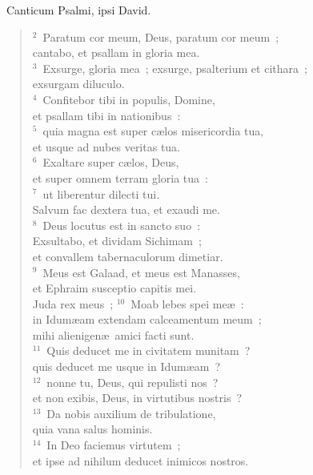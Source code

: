 ~\lettrine[lines=10,image=true,loversize=0.05,lraise=-0.03]{C}{}anticum Psalmi, ipsi David.
\begin{flushleft}\begin{verse}\vspace{6pt}${}^{2}$~Paratum cor meum, Deus, paratum cor meum~;\\ cantabo, et psallam in gloria mea.\\
${}^{3}$~Exsurge, gloria mea~; exsurge, psalterium et cithara~;\\ exsurgam diluculo.\\
${}^{4}$~Confitebor tibi in populis, Domine,\\ et psallam tibi in nationibus~:\\
${}^{5}$~quia magna est super c\ae los misericordia tua,\\ et usque ad nubes veritas tua.\\
${}^{6}$~Exaltare super c\ae los, Deus,\\ et super omnem terram gloria tua~:\\
${}^{7}$~ut liberentur dilecti tui.\\ Salvum fac dextera tua, et exaudi me.\\
${}^{8}$~Deus locutus est in sancto suo~:\\ Exsultabo, et dividam Sichimam~;\\ et convallem tabernaculorum dimetiar.\\
${}^{9}$~Meus est Galaad, et meus est Manasses,\\ et Ephraim susceptio capitis mei.\\ Juda rex meus~;
${}^{10}$~Moab lebes spei me\ae~:\\ in Idum\ae am extendam calceamentum meum~;\\ mihi alienigen\ae\ amici facti sunt.\\
${}^{11}$~Quis deducet me in civitatem munitam~?\\ quis deducet me usque in Idum\ae am~?\\
${}^{12}$~nonne tu, Deus, qui repulisti nos~?\\ et non exibis, Deus, in virtutibus nostris~?\\
${}^{13}$~Da nobis auxilium de tribulatione,\\ quia vana salus hominis.\\
${}^{14}$~In Deo faciemus virtutem~;\\ et ipse ad nihilum deducet inimicos nostros.\end{verse}\end{flushleft}


